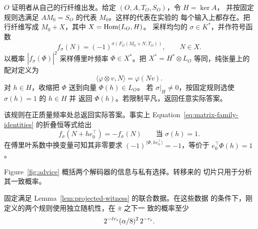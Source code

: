 $O$ 证明者从自己的行纤维出发。给定 $(O,A,T_O,S_O)$，令 $H=\ker A$，
并按固定规则选满足 $AM_0=S_O$ 的代表 $M_0$。这样的代表在实验的
每个输入上都存在。把行纤维写成 $M_0+X$，其中 $X=\operatorname{Hom}(L_O,H)$。
采样均匀的 $\sigma\in K^*$，并作符号函数
\[
 f_\sigma(N)=(-1)^{\sigma(F_O(M_0+N,T_O))},\qquad N\in X.
\]
以概率 $|\widehat f_\sigma(\Phi)|^2$ 采样傅里叶频率
$\Phi\in X^*$。把 $X^*=H^*\otimes L_O$ 等同，纯张量上的配对定义为
\[
 \langle\varphi\otimes v,N\rangle=\varphi(Nv).
\]
对 $h\in H$，收缩把 $\Phi$ 送到向量 $\Phi(h)\in L_O$。
若 $\sigma|_H\ne0$，按固定规则选使 $\sigma(h)=1$ 的 $h\in H$ 并
返回 $\Phi(h)$。若限制平凡，返回任意实际答案。

该规则在正质量频率处总返回实际答案。事实上
Equation~\eqref{eq:matrix-family-identities} 的折叠恒等式给出
\[
 f_\sigma(N+h e_0^\top)=-f_\sigma(N)
 \qquad\text{当 }\sigma(h)=1.
\]
在傅里叶系数中换变量可知其非零要求
$(-1)^{\langle\Phi,h e_0^\top\rangle}=-1$，等价于
$e_0^\top\Phi(h)=1$。

Figure~\ref{fig:advice} 概括两个解码器的信息与私有选择。转移来的
切片只用于分析其一致概率。

\FloatBarrier

\begin{lemma}[转移切片给出一致]
\label{lem:fourier-coset-decoding}
固定满足 Lemma~\ref{lem:projected-witness} 的联合数据。在这些数据
的条件下，刚定义的两个规则使用独立随机性，在 $\bar\pi$ 之下一
致的概率至少
\begin{equation}
 2^{-\ell r_{\rm s}}(\alpha/8)^2\,2^{-r_{\rm s}}.
 \label{eq:conditional-decoding}
\end{equation}
\end{lemma}

